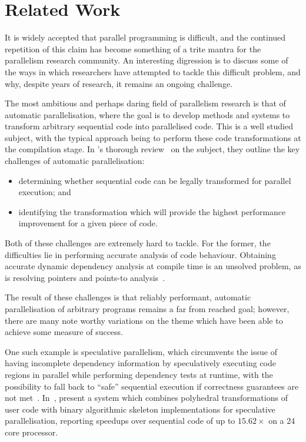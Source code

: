 \chapter{Related Work}


It is widely accepted that parallel programming is difficult, and the
continued repetition of this claim has become something of a trite
mantra for the parallelism research community. An interesting
digression is to discuss some of the ways in which researchers have
attempted to tackle this difficult problem, and why, despite years of
research, it remains an ongoing challenge.

The most ambitious and perhaps daring field of parallelism research is
that of automatic parallelisation, where the goal is to develop
methods and systems to transform arbitrary sequential code into
parallelised code. This is a well studied subject, with the typical
approach being to perform these code transformations at the
compilation stage. In \citeauthor{Banerjee1993}'s thorough
review~\cite{Banerjee1993} on the subject, they outline the key
challenges of automatic parallelisation:
%
\begin{itemize}
	\item determining whether sequential code can be legally transformed
	for parallel execution; and
	\item identifying the transformation which will provide the highest
	performance improvement for a given piece of code.
\end{itemize}
%
Both of these challenges are extremely hard to tackle. For the former,
the difficulties lie in performing accurate analysis of code
behaviour. Obtaining accurate dynamic dependency analysis at compile
time is an unsolved problem, as is resolving pointers and points-to
analysis~\cite{Atkin-granville2013, Hind2001,Ghiya2001}.

The result of these challenges is that reliably performant, automatic
parallelisation of arbitrary programs remains a far from reached goal;
however, there are many note worthy variations on the theme which have
been able to achieve some measure of success.

One such example is speculative parallelism, which circumvents the
issue of having incomplete dependency information by speculatively
executing code regions in parallel while performing dependency tests
at runtime, with the possibility to fall back to ``safe'' sequential
execution if correctness guarantees are not
met~\cite{Prabhu2010,Trachsel2010}.  In~\cite{Jimborean2014},
\citeauthor{Jimborean2014} present a system which combines polyhedral
transformations of user code with binary algorithmic skeleton
implementations for speculative parallelisation, reporting speedups
over sequential code of up to $15.62\times$ on a 24 core processor.

